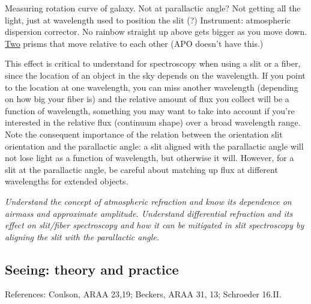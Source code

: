 \documentclass[12pt]{article}
\newcommand{\mynotes}[1]{\textcolor{myBlue}{#1}}
\newcommand{\test}[1]{%
    \begin{center}
        {\parbox{0.9\textwidth}{\textit{\small#1}}}
    \end{center}}
\begin{document}
\mynotes{Measuring rotation curve of galaxy. Not at parallactic angle? Not
getting all the light, just at wavelength used to position the slit (?)
Instrument: atmospheric dispersion corrector. No rainbow straight up above gets
bigger as you move down. \underline{Two} prisms that move relative to each
other (APO doesn't have this.)}

This effect is critical to understand for spectroscopy when using a slit or a
fiber, since the location of an object in the sky depends on the wavelength. If
you point to the location at one wavelength, you can miss another wavelength
\mynotes{(depending on how big your fiber is)} and the relative amount of flux
you collect will be a function of wavelength, something you may want to take
into account if you're interested in the relative flux (continuum shape) over a
broad wavelength range. Note the consequent importance of the relation between
the orientation slit orientation and the parallactic angle: a slit aligned with
the parallactic angle will not lose light as a function of wavelength, but
otherwise it will. However, for a slit at the parallactic angle, be careful
about matching up flux at different wavelengths for extended objects.

\test{Understand the concept of atmospheric refraction and know its dependence
on airmass and approximate amplitude. Understand differential refraction and
its effect on slit/fiber spectroscopy and how it can be mitigated in slit
spectroscopy by aligning the slit with the parallactic angle.}

\subsection{Seeing: theory and practice}
References: Coulson, ARAA 23,19; Beckers, ARAA 31, 13; Schroeder 16.II.
\end{document}
